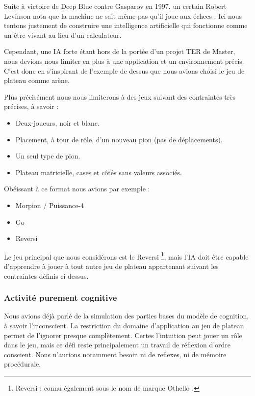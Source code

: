 Suite à victoire de Deep Blue contre Gasparov en 1997, un certain Robert Levinson nota que la machine \og ne sait même pas qu'il joue aux échecs \fg{}. Ici nous tentons justement de construire une intelligence artificielle qui fonctionne comme un être vivant au lieu d'un calculateur.

Cependant, une IA \og forte \fg{} étant hors de la portée d'un projet TER de Master, nous devions nous limiter en plus à une application et un environnement précis. C'est donc en s'inspirant de l'exemple de dessus que nous avions choisi le jeu de plateau comme arène.

Plus précisément nous nous limiterons à des jeux suivant des contraintes très précises, à savoir :

\begin{itemize}
\item Deux-joueurs, noir et blanc.
\item Placement, à tour de rôle, d'un nouveau pion (pas de déplacements).
\item Un seul type de pion.
\item Plateau matricielle, cases et côtés sans valeurs associés.
\end{itemize}

Obéissant à ce format nous avions par exemple :

\begin{itemize}
\item Morpion / Puissance-4
\item Go
\item Reversi
\end{itemize}

Le jeu principal que nous considérons est le \og Reversi \footnote{ \og Reversi \fg{} : connu également sous le nom de marque \og Othello \fg{}. }\fg{}, mais l'IA doit être capable d'apprendre à jouer à tout autre jeu de plateau appartenant suivant les contraintes définis ci-dessus.

\subsubsection{Activité purement cognitive}
Nous avions déjà parlé de la simulation des parties bases du modèle de cognition, à savoir l'inconscient. La restriction du domaine d'application au jeu de plateau permet de l'ignorer presque complètement. Certes l'intuition peut jouer un rôle dans le jeu, mais ce défi reste principalement un travail de réflexion d'ordre conscient. Nous n'aurions notamment besoin ni de reflexes, ni de mémoire procédurale.

